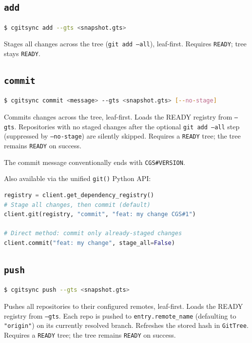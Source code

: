 \subsection{\texttt{add}}

\begin{lstlisting}[language=bash]
$ cgitsync add --gts <snapshot.gts>
\end{lstlisting}

Stages all changes across the tree (\texttt{git add --all}), leaf-first.
Requires \texttt{READY}; tree stays \texttt{READY}.

\subsection{\texttt{commit}}

\begin{lstlisting}[language=bash]
$ cgitsync commit <message> --gts <snapshot.gts> [--no-stage]
\end{lstlisting}

Commits changes across the tree, leaf-first.  Loads the READY registry from
\texttt{--gts}.  Repositories with no staged changes after the optional
\texttt{git add --all} step (suppressed by \texttt{--no-stage}) are silently
skipped. Requires a \texttt{READY} tree; the tree remains \texttt{READY} on success.

The commit message conventionally ends with \texttt{CGS\#VERSION}.

Also available via the unified \texttt{git()} Python API:

\begin{lstlisting}[language=Python]
registry = client.get_dependency_registry()
# Stage all changes, then commit (default)
client.git(registry, "commit", "feat: my change CGS#1")

# Direct method: commit only already-staged changes
client.commit("feat: my change", stage_all=False)
\end{lstlisting}

\subsection{\texttt{push}}

\begin{lstlisting}[language=bash]
$ cgitsync push --gts <snapshot.gts>
\end{lstlisting}

Pushes all repositories to their configured remotes, leaf-first.  Loads the
READY registry from \texttt{--gts}.  Each repo is pushed to
\texttt{entry.remote\_name} (defaulting to \texttt{"origin"}) on its currently
resolved branch.  Refreshes the stored hash in \texttt{GitTree}.  Requires a
\texttt{READY} tree; the tree remains \texttt{READY} on success.

